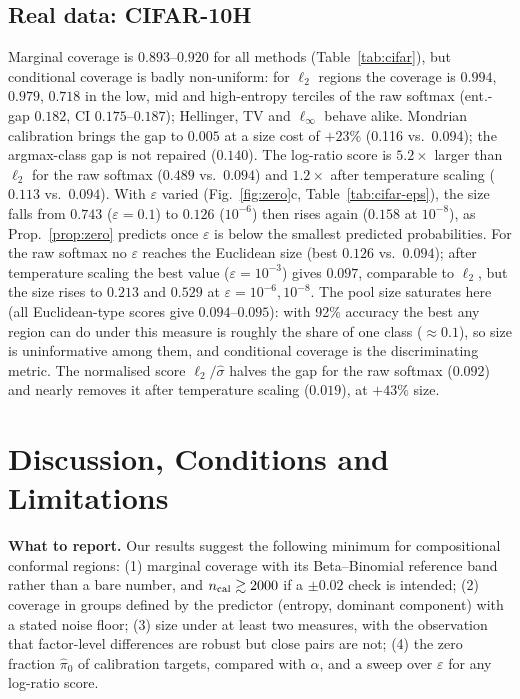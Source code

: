 \documentclass{article}
\theoremstyle{plain}
\theoremstyle{remark}
\begin{document}
\subsection{Real data: CIFAR-10H}
\begin{table}[t]
\caption{CIFAR-10H, $n_{\rm cal}=500$, 100 replicates. cov.: marginal coverage; size: pool size (bold: smallest); ent.-gap and arg-gap: worst entropy-tercile / argmax-class deviation from $0.9$. 95\% CI half-widths: coverage $\le0.003$, size $\le 0.006$, ent.-gap and arg-gap $\le0.008$.}
\label{tab:cifar}
\centering\small

\end{table}
Marginal coverage is $0.893$--$0.920$ for all methods (Table~\ref{tab:cifar}), but conditional coverage is badly non-uniform: for $\ell_2$ regions the coverage is $0.994$, $0.979$, $0.718$ in the low, mid and high-entropy terciles of the raw softmax (ent.-gap $0.182$, CI $0.175$--$0.187$); Hellinger, TV and $\ell_\infty$ behave alike. Mondrian calibration brings the gap to $0.005$ at a size cost of $+23\%$ (0.116 vs.\ 0.094); the argmax-class gap is not repaired ($0.140$). The log-ratio score is $5.2\times$ larger than $\ell_2$ for the raw softmax ($0.489$ vs.\ $0.094$) and $1.2\times$ after temperature scaling ($0.113$ vs.\ $0.094$). With $\varepsilon$ varied (Fig.~\ref{fig:zero}c, Table~\ref{tab:cifar-eps}), the size falls from $0.743$ ($\varepsilon=0.1$) to $0.126$ ($10^{-6}$) then rises again ($0.158$ at $10^{-8}$), as Prop.~\ref{prop:zero} predicts once $\varepsilon$ is below the smallest predicted probabilities. For the raw softmax no $\varepsilon$ reaches the Euclidean size (best $0.126$ vs.\ $0.094$); after temperature scaling the best value ($\varepsilon=10^{-3}$) gives $0.097$, comparable to $\ell_2$, but the size rises to $0.213$ and $0.529$ at $\varepsilon=10^{-6},10^{-8}$. The pool size saturates here (all Euclidean-type scores give $0.094$--$0.095$): with 92\% accuracy the best any region can do under this measure is roughly the share of one class ($\approx 0.1$), so size is uninformative among them, and conditional coverage is the discriminating metric. The normalised score $\ell_2/\hat\sigma$ halves the gap for the raw softmax ($0.092$) and nearly removes it after temperature scaling ($0.019$), at $+43\%$ size.

\section{Discussion, Conditions and Limitations}
\label{sec:disc}
\textbf{What to report.} Our results suggest the following minimum for compositional conformal regions: (1) marginal coverage with its Beta--Binomial reference band rather than a bare number, and $n_{\rm cal}\gtrsim2000$ if a $\pm0.02$ check is intended; (2) coverage in groups defined by the predictor (entropy, dominant component) with a stated noise floor; (3) size under at least two measures, with the observation that factor-level differences are robust but close pairs are not; (4) the zero fraction $\hat\pi_0$ of calibration targets, compared with $\alpha$, and a sweep over $\varepsilon$ for any log-ratio score.
\end{document}
